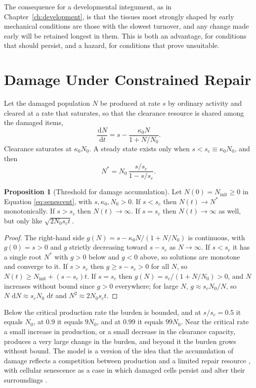 \documentclass[11pt,openany]{book}
\theoremstyle{definition}
\newtheorem{proposition}{Proposition}[chapter]
\theoremstyle{remark}
\newcommand{\dd}{\,\mathrm{d}}
\begin{document}
The consequence for a developmental integument, as in Chapter~\ref{ch:development}, is that the tissues most strongly shaped by early mechanical conditions are those with the slowest turnover, and any change made early will be retained longest in them. This is both an advantage, for conditions that should persist, and a hazard, for conditions that prove unsuitable.

\section{Damage Under Constrained Repair}

Let the damaged population $N$ be produced at rate $s$ by ordinary activity and cleared at a rate that saturates, so that the clearance resource is shared among the damaged items,
\begin{equation}
\frac{\dd N}{\dd t}=s-\frac{\kappa_0N}{1+N/N_0}.
\label{eq:senescent}
\end{equation}
Clearance saturates at $\kappa_0N_0$. A steady state exists only when $s<s_c\equiv\kappa_0N_0$, and then
\begin{equation}
N^{*}=N_0\,\frac{s/s_c}{1-s/s_c}.
\label{eq:nstar}
\end{equation}
\begin{proposition}[Threshold for damage accumulation]
\label{prop:senescent}
Let $N(0)=N_{\mathrm{init}}\ge0$ in Equation \eqref{eq:senescent}, with $s,\kappa_0,N_0>0$. If $s<s_c$ then $N(t)\to N^{*}$ monotonically. If $s>s_c$ then $N(t)\to\infty$. If $s=s_c$ then $N(t)\to\infty$ as well, but only like $\sqrt{2N_0s_c t}$.
\end{proposition}

\begin{proof}
The right-hand side $g(N)=s-\kappa_0N/(1+N/N_0)$ is continuous, with $g(0)=s>0$ and $g$ strictly decreasing toward $s-s_c$ as $N\to\infty$. If $s<s_c$ it has a single root $N^{*}$ with $g>0$ below and $g<0$ above, so solutions are monotone and converge to it. If $s>s_c$ then $g\ge s-s_c>0$ for all $N$, so $N(t)\ge N_{\mathrm{init}}+(s-s_c)t$. If $s=s_c$ then $g(N)=s_c/(1+N/N_0)>0$, and $N$ increases without bound since $g>0$ everywhere; for large $N$, $g\approx s_cN_0/N$, so $N\,\dd N\approx s_cN_0\,\dd t$ and $N^2\approx2N_0s_ct$.
\end{proof}

Below the critical production rate the burden is bounded, and at $s/s_c=0.5$ it equals $N_0$, at $0.9$ it equals $9N_0$, and at $0.99$ it equals $99N_0$. Near the critical rate a small increase in production, or a small decrease in the clearance capacity, produces a very large change in the burden, and beyond it the burden grows without bound. The model is a version of the idea that the accumulation of damage reflects a competition between production and a limited repair resource \cite{kirkwood1977}, with cellular senescence as a case in which damaged cells persist and alter their surroundings \cite{campisi2007}.
\end{document}
